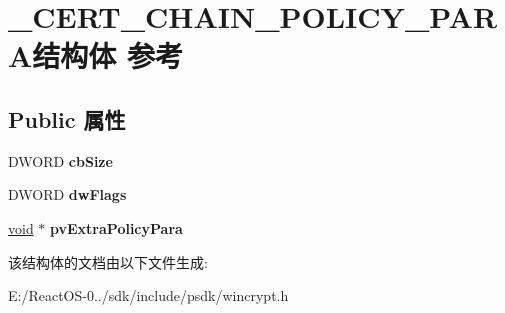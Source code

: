 \hypertarget{struct___c_e_r_t___c_h_a_i_n___p_o_l_i_c_y___p_a_r_a}{}\section{\+\_\+\+C\+E\+R\+T\+\_\+\+C\+H\+A\+I\+N\+\_\+\+P\+O\+L\+I\+C\+Y\+\_\+\+P\+A\+R\+A结构体 参考}
\label{struct___c_e_r_t___c_h_a_i_n___p_o_l_i_c_y___p_a_r_a}
\subsection*{Public 属性}
\begin{DoxyCompactItemize}
\item 
\mbox{\label{struct___c_e_r_t___c_h_a_i_n___p_o_l_i_c_y___p_a_r_a_ada01a05a2f9df898167716e751f0c056}} 
D\+W\+O\+RD {\bfseries cb\+Size}
\item 
\mbox{\label{struct___c_e_r_t___c_h_a_i_n___p_o_l_i_c_y___p_a_r_a_a624b90338fb236503db9779a39e09280}} 
D\+W\+O\+RD {\bfseries dw\+Flags}
\item 
\mbox{\label{struct___c_e_r_t___c_h_a_i_n___p_o_l_i_c_y___p_a_r_a_a62c172f20eb0d3d3b41a643e359ca2f6}} 
\hyperlink{interfacevoid}{void} $\ast$ {\bfseries pv\+Extra\+Policy\+Para}
\end{DoxyCompactItemize}


该结构体的文档由以下文件生成\+:\begin{DoxyCompactItemize}
\item 
E\+:/\+React\+O\+S-\/0../sdk/include/psdk/wincrypt.\+h\end{DoxyCompactItemize}
